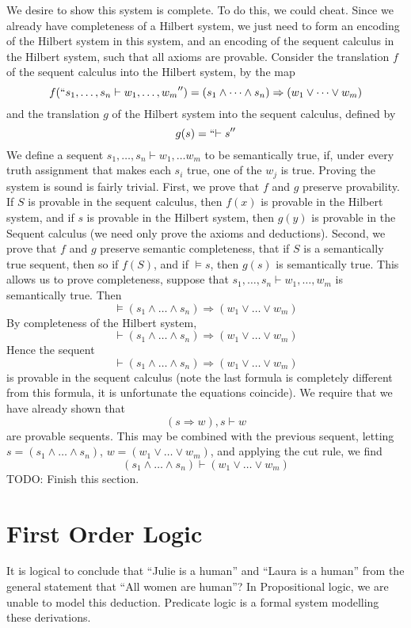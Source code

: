 We desire to show this system is complete. To do this, we could cheat. Since we already have completeness of a Hilbert system, we just need to form an encoding of the Hilbert system in this system, and an encoding of the sequent calculus in the Hilbert system, such that all axioms are provable. Consider the translation $f$ of the sequent calculus into the Hilbert system, by the map
%
\[ f(``{s_1, \dots, s_n \vdash w_1, \dots, w_m}'') = (s_1 \wedge \dots \wedge s_n) \Rightarrow (w_1 \vee \dots \vee w_m) \]
%
and the translation $g$ of the Hilbert system into the sequent calculus, defined by
%
\[ g(s) = ``{\vdash s}'' \]
%
We define a sequent $s_1, \dots, s_n \vdash w_1, \dots w_m $ to be semantically true, if, under every truth assignment that makes each $s_i$ true, one of the $w_j$ is true. Proving the system is sound is fairly trivial. First, we prove that $f$ and $g$ preserve provability. If $S$ is provable in the sequent calculus, then $f(x)$ is provable in the Hilbert system, and if $s$ is provable in the Hilbert system, then $g(y)$ is provable in the Sequent calculus (we need only prove the axioms and deductions). Second, we prove that $f$ and $g$ preserve semantic completeness, that if $S$ is a semantically true sequent, then so if $f(S)$, and if $\vDash s$, then $g(s)$ is semantically true. This allows us to prove completeness, suppose that $s_1, \dots, s_n \vdash w_1, \dots, w_m$ is semantically true. Then
%
\[ \vDash (s_1 \wedge \dots \wedge s_n) \Rightarrow (w_1 \vee \dots \vee w_m) \]
%
By completeness of the Hilbert system,
%
\[ \vdash (s_1 \wedge \dots \wedge s_n) \Rightarrow (w_1 \vee \dots \vee w_m) \]
%
Hence the sequent
%
\[ \vdash (s_1 \wedge \dots \wedge s_n) \Rightarrow (w_1 \vee \dots \vee w_m) \]
%
is provable in the sequent calculus (note the last formula is completely different from this formula, it is unfortunate the equations coincide). We require that we have already shown that
%
\[ (s \Rightarrow w), s \vdash w \]
%
are provable sequents. This may be combined with the previous sequent, letting $s = (s_1 \wedge \dots \wedge s_n)$, $w = (w_1 \vee \dots \vee w_m)$, and applying the cut rule, we find
%
\[ (s_1 \wedge \dots \wedge s_n) \vdash (w_1 \vee \dots \vee w_m) \]
%
TODO: Finish this section.



\chapter{First Order Logic}

It is logical to conclude that ``Julie is a human'' and ``Laura is a human'' from the general statement that ``All women are human''? In Propositional logic, we are unable to model this deduction. Predicate logic is a formal system modelling these derivations.

